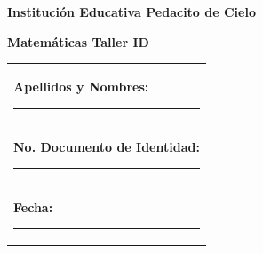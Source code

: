 \documentclass[10pt,a4paper]{article}
\makeatletter
\newcommand{\myID}{\@ID}
\newcommand{\myDate}{\@Date}
\makeatother
\begin{document}
\thispagestyle{empty}
{\sf
\textbf{\LARGE{Institución Educativa Pedacito de Cielo}}

\textbf{\large{Matemáticas \myDate \hfill Taller ID \myID}}

\vspace*{2cm}

\begin{tabular}{p{14cm}}
\textbf{Apellidos y Nombres:} \hrule \\[1.5cm]
\textbf{No. Documento de Identidad:} \hrule \\[1.5cm]
\textbf{Fecha:} \hrule  \\[1.5cm]
\end{tabular}

\vspace*{1cm}

}
\newpage

\begin{enumerate}


\end{enumerate}
\end{document}
